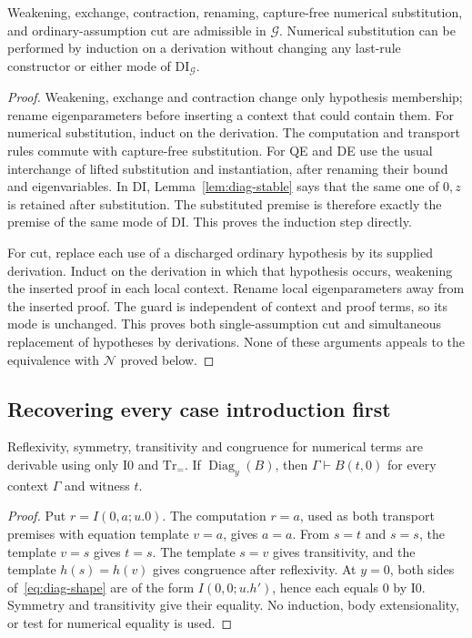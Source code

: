 \begin{lemma}
\label{lem:diag-structural}
Weakening, exchange, contraction, renaming, capture-free numerical
substitution, and ordinary-assumption cut are admissible in $\mathcal G$.
Numerical substitution can be performed by induction on a derivation
without changing any last-rule constructor or either mode of
$\mathrm{DI}_{\mathcal G}$.
\end{lemma}
\begin{proof}
Weakening, exchange and contraction change only hypothesis membership;
rename eigenparameters before inserting a context that could contain
them.  For numerical substitution, induct on the derivation.  The
computation and transport rules commute with capture-free substitution.
For QE and DE use the usual interchange of lifted substitution and
instantiation, after renaming their bound and eigenvariables.  In DI,
Lemma~\ref{lem:diag-stable} says that the same one of $0,z$ is retained
after substitution.  The substituted premise is therefore exactly the
premise of the same mode of DI.  This proves the induction step directly.

For cut, replace each use of a discharged ordinary hypothesis by its
supplied derivation.  Induct on the derivation in which that hypothesis
occurs, weakening the inserted proof in each local context.  Rename local
eigenparameters away from the inserted proof.  The guard is independent
of context and proof terms, so its mode is unchanged.  This proves both
single-assumption cut and simultaneous replacement of hypotheses by
derivations.  None of these arguments appeals to the equivalence with
$\mathcal N$ proved below.
\end{proof}

\subsection{Recovering every case introduction first}

\begin{lemma}
\label{lem:diag-base}
Reflexivity, symmetry, transitivity and congruence for numerical terms are
derivable using only I0 and $\mathrm{Tr}_{=}$.  If
$\operatorname{Diag}_y(B)$, then $\Gamma\vdash B(t,0)$ for every
context $\Gamma$ and witness $t$.
\end{lemma}
\begin{proof}
Put $r=I(0,a;u.0)$.  The computation $r=a$, used as both transport
premises with equation template $v=a$, gives $a=a$.
From $s=t$ and $s=s$, the template $v=s$ gives $t=s$.
The template $s=v$ gives transitivity, and the template
$h(s)=h(v)$ gives congruence after reflexivity.
At $y=0$, both sides of~\eqref{eq:diag-shape} are of the form
$I(0,0;u.h')$, hence each equals $0$ by I0.
Symmetry and transitivity give their equality.  No induction, body
extensionality, or test for numerical equality is used.
\end{proof}

